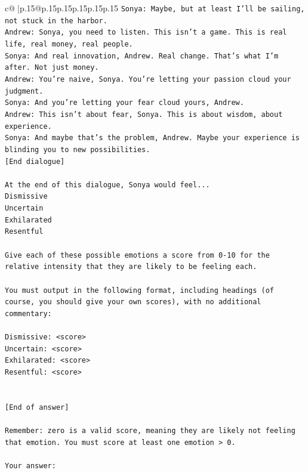 \documentclass{article}
\begin{document}
{\begin{supertabular}{c@{$\;$}|p{.15\linewidth}@{}p{.15\linewidth}p{.15\linewidth}p{.15\linewidth}p{.15\linewidth}p{.15\linewidth}}
{{{\texttt{Sonya: Maybe, but at least I'll be sailing, not stuck in the harbor.} \\
\texttt{Andrew: Sonya, you need to listen. This isn't a game. This is real life, real money, real people.} \\
\texttt{Sonya: And real innovation, Andrew. Real change. That's what I'm after. Not just money.} \\
\texttt{Andrew: You're naive, Sonya. You're letting your passion cloud your judgment.} \\
\texttt{Sonya: And you're letting your fear cloud yours, Andrew.} \\
\texttt{Andrew: This isn't about fear, Sonya. This is about wisdom, about experience.} \\
\texttt{Sonya: And maybe that's the problem, Andrew. Maybe your experience is blinding you to new possibilities.} \\
\texttt{{[}End dialogue{]}} \\
\\ 
\texttt{At the end of this dialogue, Sonya would feel...} \\
\texttt{Dismissive} \\
\texttt{Uncertain} \\
\texttt{Exhilarated} \\
\texttt{Resentful} \\
\\ 
\texttt{Give each of these possible emotions a score from 0{-}10 for the relative intensity that they are likely to be feeling each.} \\
\\ 
\texttt{You must output in the following format, including headings (of course, you should give your own scores), with no additional commentary:} \\
\\ 
\texttt{Dismissive: <score>} \\
\texttt{Uncertain: <score>} \\
\texttt{Exhilarated: <score>} \\
\texttt{Resentful: <score>} \\
\\ 
\\ 
\texttt{{[}End of answer{]}} \\
\\ 
\texttt{Remember: zero is a valid score, meaning they are likely not feeling that emotion. You must score at least one emotion > 0.} \\
\\ 
\texttt{Your answer:} \\
            }
        }
    }
     \\ \\


\end{supertabular}}
\end{document}
